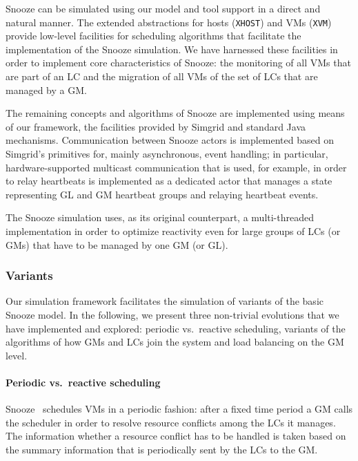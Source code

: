 Snooze can be simulated using our model and tool support in a direct
and natural manner. The extended abstractions  for hosts (\texttt{XHOST}) and VMs
(\texttt{XVM}) provide low-level facilities for scheduling algorithms
that facilitate the implementation of the Snooze simulation. We have
harnessed these facilities in order to implement core characteristics
of Snooze: the monitoring of all VMs that are part of an LC and the
migration of all VMs of the set of LCs that are managed by a GM.

The remaining concepts and algorithms of Snooze are implemented using
means of our framework, the facilities provided by Simgrid and
standard Java mechanisms. Communication between Snooze actors is
implemented based on Simgrid's primitives for, mainly asynchronous,
event handling; in particular, hardware-supported multicast
communication that is used, for example, in order to relay heartbeats
is implemented as a dedicated actor that manages a state representing
GL and GM heartbeat groups and relaying heartbeat events.

The Snooze simulation uses, as its original counterpart, a
multi-threaded implementation in order to optimize reactivity even for
large groups of LCs (or GMs) that have to be managed by one GM (or
GL).

\subsubsection{Variants}

Our simulation framework facilitates the simulation of variants of the
basic Snooze model. In the following, we present three non-trivial
evolutions that we have implemented and explored: periodic vs.\
reactive scheduling, variants of the algorithms of how GMs and LCs
join the system and load balancing on the GM level.

\paragraph{Periodic vs.\ reactive scheduling}

Snooze~\cite{feller:ccgrid12} schedules VMs in a periodic fashion:
after a fixed time period a GM calls the scheduler in order to resolve
resource conflicts among the LCs it manages. The information whether a
resource conflict has to be handled is taken based on the summary
information that is periodically sent by the LCs to the GM. 

